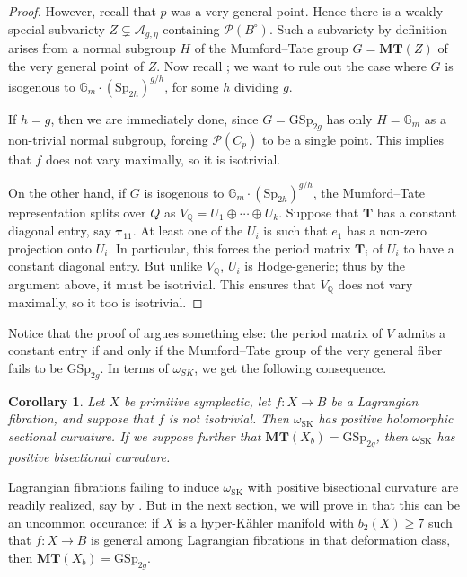 \documentclass[12pt]{amsart}
\newcommand{\Q}{\mathbb{Q}}
\newcommand{\cP}{\mathcal{P}}
\newcommand{\cA}{\mathcal{A}}
\newcommand{\Sp}{\mathrm{Sp}}
\newtheorem{corollary}[theorem]{Corollary}
\theoremstyle{definition}
\numberwithin{equation}{section}
\begin{document}
\begin{proof}
However, recall that \(p\) was a very general point. Hence there is a 
weakly special subvariety \(Z \subsetneq \cA_{g, \eta}\) containing \(\cP(B^\circ)\). 
Such a subvariety by definition arises from a normal subgroup \(H\) of the 
Mumford--Tate group \(G = \mathbf{MT}(Z)\) of the very general point of \(Z\).
Now recall ; we want to rule out the case where \(G\) is
isogenous to \(\mathbb{G}_m \cdot (\Sp_{2h})^{g/h}\), for some \(h\) dividing \(g\). 

If \(h = g\), then we are immediately done, since \(G = \mathrm{GSp}_{2g}\) has 
only \(H = \mathbb{G}_m\) as a non-trivial normal subgroup, forcing \(\cP(C_p)\) to be a 
single point. This implies that \(f\) does not vary maximally, so it is 
isotrivial. 

On the other hand, if \(G\) is isogenous to \(\mathbb{G}_m \cdot (\Sp_{2h})^{g/h}\), 
the Mumford--Tate representation splits over \(Q\) as 
\(V_\Q = U_1 \oplus \cdots \oplus U_k\). Suppose that \(\mathbf{T}\) has a 
constant diagonal entry, say \(\mathbf{\tau}_{11}\). At least one of the \(U_i\) 
is such that \(e_1\) has a non-zero projection onto \(U_i\). In particular, 
this forces the period matrix \(\mathbf{T}_i\) of \(U_i\) to have a constant diagonal 
entry. But unlike \(V_\Q\), \(U_i\) is Hodge-generic; thus by the argument above, 
it must be isotrivial. This ensures that \(V_\Q\) does not vary maximally, 
so it too is isotrivial. 
\end{proof}

Notice that the proof of  argues something else: 
the period matrix of \(V\) admits a constant entry if and only if the Mumford--Tate group 
of the very general fiber fails to be \(\mathrm{GSp}_{2g}\). 
In terms of \(\omega_{SK}\), we get the following consequence.

\begin{corollary} \label{omega_SK}
    Let \(X\) be primitive symplectic, let \(f: X \to B\) be a Lagrangian fibration, 
    and suppose that \(f\) is not isotrivial. Then \(\omega_\mathrm{SK}\) has positive 
    holomorphic sectional curvature. If we suppose further that 
    \(\mathbf{MT}(X_b) = \mathrm{GSp}_{2g}\), then \(\omega_\mathrm{SK}\) has 
    positive bisectional curvature. 
\end{corollary}

Lagrangian fibrations failing to induce \(\omega_{\mathrm{SK}}\) with positive 
bisectional curvature are 
readily realized, say by . But in the next section, we will prove in
 that this can be an uncommon occurance: if \(X\) is a 
hyper-K\"ahler manifold with \(b_2(X) \geq 7\) such that \(f: X \to B\) is general 
among Lagrangian fibrations in that deformation class, then 
\(\mathbf{MT}(X_b) = \mathrm{GSp}_{2g}\). 
\end{document}
